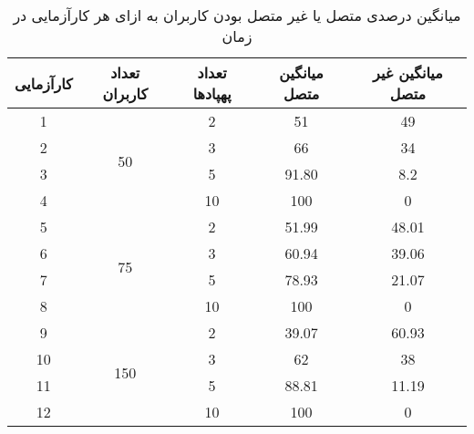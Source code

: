 \begin{table}%
\centering
\caption{میانگین درصدی متصل یا غیر متصل بودن کاربران به ازای هر کار‌آزمایی در زمان}
\begin{tabular}{|c|c|c|c|c|}
\hline
کار‌آزمایی & تعداد کاربران        & تعداد پهپاد‌ها & میانگین متصل & میانگین‌ غیر متصل‌ \\ \hline
1          & \multirow{4}{*}{50}  & 2                 & 51                   & 49                      \\ \cline{1-1} \cline{3-5} 
2          &                      & 3                 & 66                   & 34                      \\ \cline{1-1} \cline{3-5} 
3          &                      & 5                 & 91.80                & 8.2                     \\ \cline{1-1} \cline{3-5} 
4          &                      & 10                & 100                  & 0                       \\ \hline
5          & \multirow{4}{*}{75}  & 2                 & 51.99                & 48.01                   \\ \cline{1-1} \cline{3-5} 
6          &                      & 3                 & 60.94                & 39.06                   \\ \cline{1-1} \cline{3-5} 
7          &                      & 5                 & 78.93                & 21.07                   \\ \cline{1-1} \cline{3-5} 
8          &                      & 10                & 100                  & 0                       \\ \hline
9          & \multirow{4}{*}{150} & 2                 & 39.07                & 60.93                   \\ \cline{1-1} \cline{3-5} 
10         &                      & 3                 & 62                   & 38                      \\ \cline{1-1} \cline{3-5} 
11         &                      & 5                 & 88.81                & 11.19                   \\ \cline{1-1} \cline{3-5} 
12         &                      & 10                 & 100                  & 0                       \\ \hline
\end{tabular}
\label{tab:connectdiseduser}
\end{table}